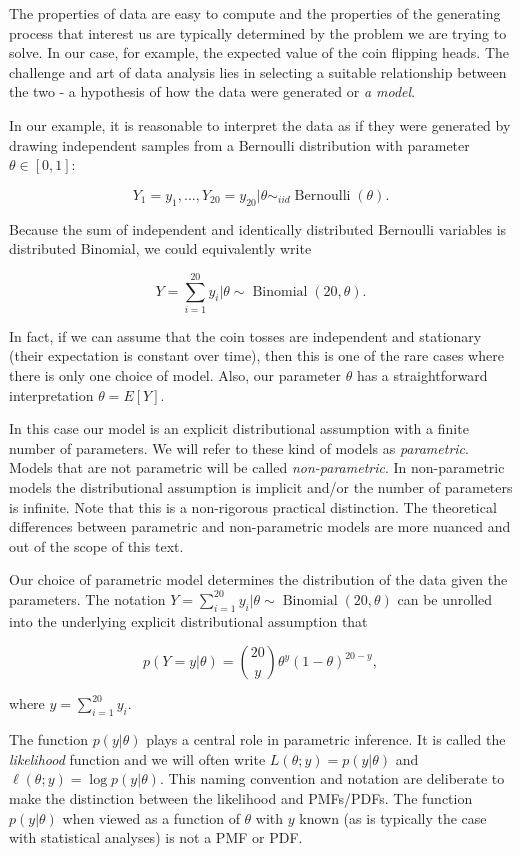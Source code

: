 \documentclass{book}
\theoremstyle{plain}%
\theoremstyle{definition}
\DeclareMathOperator{\Binomial}{Binomial}
\DeclareMathOperator{\Bernoulli}{Bernoulli}
\begin{document}
The properties of data are easy to compute and the properties of the generating process that interest us are typically determined by the problem we are trying to solve. In our case, for example, the expected value of the coin flipping heads. The challenge and art of data analysis lies in selecting a suitable relationship between the two - a hypothesis of how the data were generated or \emph{a model}.

In our example, it is reasonable to interpret the data as if they were generated by drawing independent samples from a Bernoulli distribution with parameter $\theta \in [0,1]$:

$$Y_1 = y_1,...,Y_{20} = y_{20}|\theta\sim_{iid} \Bernoulli(\theta).$$

Because the sum of independent and identically distributed Bernoulli variables is distributed Binomial, we could equivalently write

$$Y = \sum_{i = 1}^{20} y_i|\theta \sim \Binomial(20, \theta).$$

In fact, if we can assume that the coin tosses are independent and stationary (their expectation is constant over time), then this is one of the rare cases where there is only one choice of model. Also, our parameter $\theta$ has a straightforward interpretation $\theta = E[Y]$.

In this case our model is an explicit distributional assumption with a finite number of parameters. We will refer to these kind of models as \emph{parametric}. Models that are not parametric will be called \emph{non-parametric}. In non-parametric models the distributional assumption is implicit and/or the number of parameters is infinite. Note that this is a non-rigorous practical distinction. The theoretical differences between parametric and non-parametric models are more nuanced and out of the scope of this text.

Our choice of parametric model determines the distribution of the data given the parameters. The notation $Y = \sum_{i = 1}^{20} y_i|\theta \sim \Binomial(20, \theta)$ can be unrolled into the underlying explicit distributional assumption that

$$p(Y = y|\theta) = {20 \choose y} \theta^{y}(1-\theta)^{20 - y},$$

where $y = \sum_{i = 1}^{20} y_i$.

The function $p(y|\theta)$ plays a central role in parametric inference. It is called the \textit{likelihood} function and we will often write $L(\theta;y) = p(y|\theta)$ and $\ell(\theta;y) = \log p(y|\theta)$. This naming convention and notation are deliberate to make the distinction between the likelihood and PMFs/PDFs. The function $p(y|\theta)$ when viewed as a function of $\theta$ with $y$ known (as is typically the case with statistical analyses) is not a PMF or PDF.
\end{document}
